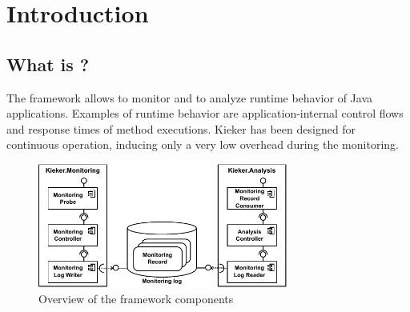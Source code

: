 % 


\chapter{Introduction}


\section{What is \Kieker?}\label{sec:kieker}

The \Kieker{} framework allows to monitor and to analyze runtime behavior %
of Java applications. Examples of runtime behavior are application-internal %
control flows and response times of method executions. %
Kieker has been designed for continuous operation, inducing only a very low %
overhead during the monitoring. 

\begin{figure}[H]\centering
\includegraphics[width=0.73\textwidth]{images/kiekerComponentDiagram-woCloud-bw-w-record-newNames}
\caption{Overview of the framework components}
\label{Figure:KiekerComponentDiagram}
\end{figure}
		
